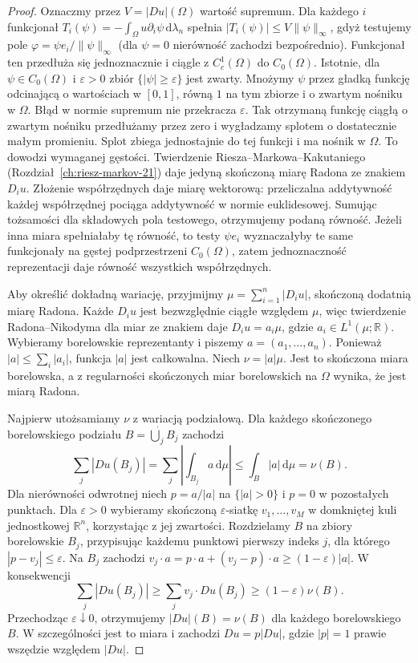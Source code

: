 \begin{proof}
Oznaczmy przez $V=|Du|(\Omega)$ wartość supremum.
Dla każdego $i$ funkcjonał
$T_i(\psi)=-\int_\Omega u\partial_i\psi\,\mathrm d\lambda_n$
spełnia $|T_i(\psi)|\le V\|\psi\|_\infty$,
gdyż testujemy pole $\varphi=\psi e_i/\|\psi\|_\infty$
(dla $\psi=0$ nierówność zachodzi bezpośrednio). Funkcjonał ten
przedłuża się jednoznacznie i ciągle z $C_c^1(\Omega)$
do $C_0(\Omega)$. Istotnie, dla $\psi\in C_0(\Omega)$
i $\varepsilon>0$ zbiór $\{|\psi|\ge\varepsilon\}$
jest zwarty. Mnożymy $\psi$ przez gładką funkcję
odcinającą o wartościach w $[0,1]$, równą $1$
na tym zbiorze i o zwartym nośniku w $\Omega$.
Błąd w normie supremum nie przekracza $\varepsilon$.
Tak otrzymaną funkcję ciągłą o zwartym nośniku
przedłużamy przez zero i wygładzamy splotem
o dostatecznie małym promieniu. Splot zbiega
jednostajnie do tej funkcji i ma nośnik w $\Omega$.
To dowodzi wymaganej gęstości.
Twierdzenie Riesza--Markowa--Kakutaniego
(Rozdział~\ref{ch:riesz-markov-21}) daje jedyną
skończoną miarę Radona ze znakiem $D_i u$.
Złożenie współrzędnych daje miarę wektorową:
przeliczalna addytywność każdej współrzędnej
pociąga addytywność w normie euklidesowej.
Sumując tożsamości dla składowych pola testowego,
otrzymujemy podaną równość. Jeżeli inna miara
spełniałaby tę równość, to testy $\psi e_i$
wyznaczałyby te same funkcjonały na gęstej
podprzestrzeni $C_0(\Omega)$, zatem jednoznaczność
reprezentacji daje równość wszystkich współrzędnych.

Aby określić dokładną wariację, przyjmijmy
$\mu=\sum_{i=1}^n|D_i u|$, skończoną dodatnią miarę
Radona. Każde $D_i u$ jest bezwzględnie ciągłe
względem $\mu$, więc twierdzenie Radona--Nikodyma
dla miar ze znakiem daje $D_i u=a_i\mu$,
gdzie $a_i\in L^1(\mu;\mathbb R)$. Wybieramy borelowskie
reprezentanty i piszemy $a=(a_1,\ldots,a_n)$.
Ponieważ $|a|\le\sum_i|a_i|$, funkcja $|a|$
jest całkowalna. Niech $\nu=|a|\mu$.
Jest to skończona miara borelowska, a z regularności
skończonych miar borelowskich na $\Omega$
wynika, że jest miarą Radona.

Najpierw utożsamiamy $\nu$ z wariacją podziałową.
Dla każdego skończonego borelowskiego podziału
$B=\dot\bigcup_j B_j$ zachodzi
\[
 \sum_j|Du(B_j)|=\sum_j\left|\int_{B_j}a\,\mathrm d\mu\right|
 \le\int_B|a|\,\mathrm d\mu=\nu(B).
\]
Dla nierówności odwrotnej niech $p=a/|a|$ na
$\{|a|>0\}$ i $p=0$ w pozostałych punktach.
Dla $\varepsilon>0$ wybieramy skończoną
$\varepsilon$-siatkę $v_1,\ldots,v_M$ w domkniętej
kuli jednostkowej $\mathbb R^n$, korzystając z jej
zwartości. Rozdzielamy $B$ na zbiory borelowskie $B_j$,
przypisując każdemu punktowi pierwszy indeks $j$,
dla którego $|p-v_j|\le\varepsilon$.
Na $B_j$ zachodzi
$v_j\cdot a=p\cdot a+(v_j-p)\cdot a
\ge(1-\varepsilon)|a|$.
W konsekwencji
\[
 \sum_j|Du(B_j)|\ge\sum_j v_j\cdot Du(B_j)
 \ge(1-\varepsilon)\nu(B).
\]
Przechodząc $\varepsilon\downarrow0$, otrzymujemy
$|Du|(B)=\nu(B)$ dla każdego borelowskiego $B$.
W szczególności jest to miara i zachodzi
$Du=p|Du|$, gdzie $|p|=1$ prawie wszędzie względem
$|Du|$.


\end{proof}

